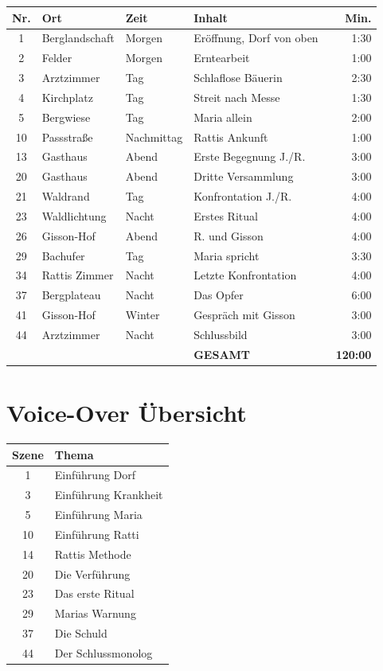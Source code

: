 \documentclass[11pt,a4paper,twoside]{book}
\begin{document}
\begin{longtable}{clllr}
\toprule
\textbf{Nr.} & \textbf{Ort} & \textbf{Zeit} & \textbf{Inhalt} & \textbf{Min.} \\
\midrule
\endhead
1 & Berglandschaft & Morgen & Eröffnung, Dorf von oben & 1:30 \\
2 & Felder & Morgen & Erntearbeit & 1:00 \\
3 & Arztzimmer & Tag & Schlaflose Bäuerin & 2:30 \\
4 & Kirchplatz & Tag & Streit nach Messe & 1:30 \\
5 & Bergwiese & Tag & Maria allein & 2:00 \\
10 & Passstraße & Nachmittag & Rattis Ankunft & 1:00 \\
13 & Gasthaus & Abend & Erste Begegnung J./R. & 3:00 \\
20 & Gasthaus & Abend & Dritte Versammlung & 3:00 \\
21 & Waldrand & Tag & Konfrontation J./R. & 4:00 \\
23 & Waldlichtung & Nacht & Erstes Ritual & 4:00 \\
26 & Gisson-Hof & Abend & R. und Gisson & 4:00 \\
29 & Bachufer & Tag & Maria spricht & 3:30 \\
34 & Rattis Zimmer & Nacht & Letzte Konfrontation & 4:00 \\
37 & Bergplateau & Nacht & Das Opfer & 6:00 \\
41 & Gisson-Hof & Winter & Gespräch mit Gisson & 3:00 \\
44 & Arztzimmer & Nacht & Schlussbild & 3:00 \\
\midrule
& & & \textbf{GESAMT} & \textbf{~120:00} \\
\bottomrule
\end{longtable}


\appendix

\chapter{Voice-Over Übersicht}

\begin{longtable}{cl}
\toprule
\textbf{Szene} & \textbf{Thema} \\
\midrule
\endhead
1 & Einführung Dorf \\
3 & Einführung Krankheit \\
5 & Einführung Maria \\
10 & Einführung Ratti \\
14 & Rattis Methode \\
20 & Die Verführung \\
23 & Das erste Ritual \\
29 & Marias Warnung \\
37 & Die Schuld \\
44 & Der Schlussmonolog \\
\bottomrule
\end{longtable}
\end{document}
